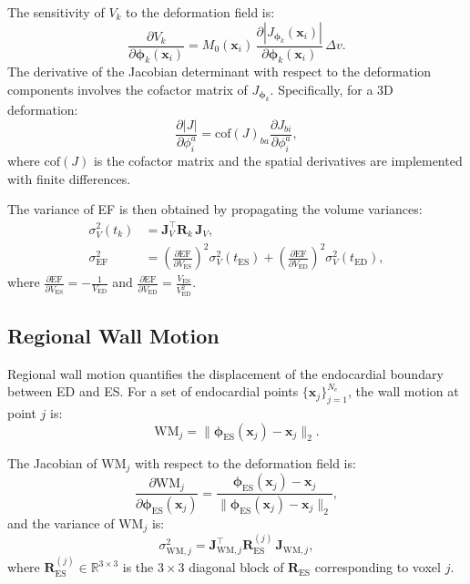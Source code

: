 \documentclass[10pt,twocolumn]{article}
\newcommand{\R}{\mathbb{R}}
\begin{document}
The sensitivity of $V_k$ to the deformation field is:
\begin{equation}
    \frac{\partial V_k}{\partial \bm{\phi}_k(\bm{x}_i)} = M_0(\bm{x}_i) \, \frac{\partial |J_{\bm{\phi}_k}(\bm{x}_i)|}{\partial \bm{\phi}_k(\bm{x}_i)} \, \Delta v.
    \label{eq:vol_sensitivity}
\end{equation}
The derivative of the Jacobian determinant with respect to the deformation components involves the cofactor matrix of $J_{\bm{\phi}_k}$. Specifically, for a 3D deformation:
\begin{equation}
    \frac{\partial |J|}{\partial \phi^a_i} = \text{cof}(J)_{ba} \frac{\partial J_{bi}}{\partial \phi^a_i},
    \label{eq:jac_det_deriv}
\end{equation}
where $\text{cof}(J)$ is the cofactor matrix and the spatial derivatives are implemented with finite differences.

The variance of EF is then obtained by propagating the volume variances:
\begin{align}
    \sigma^2_V(t_k) &= \bm{J}_V^\top \bm{R}_k \, \bm{J}_V, \label{eq:vol_var} \\
    \sigma^2_{\text{EF}} &= \left(\frac{\partial \text{EF}}{\partial V_{\text{ES}}}\right)^2 \sigma^2_V(t_{\text{ES}}) + \left(\frac{\partial \text{EF}}{\partial V_{\text{ED}}}\right)^2 \sigma^2_V(t_{\text{ED}}), \label{eq:ef_var}
\end{align}
where $\frac{\partial \text{EF}}{\partial V_{\text{ES}}} = -\frac{1}{V_{\text{ED}}}$ and $\frac{\partial \text{EF}}{\partial V_{\text{ED}}} = \frac{V_{\text{ES}}}{V_{\text{ED}}^2}$.

\subsection{Regional Wall Motion}

Regional wall motion quantifies the displacement of the endocardial boundary between ED and ES. For a set of endocardial points $\{\bm{x}_j\}_{j=1}^{N_e}$, the wall motion at point $j$ is:
\begin{equation}
    \text{WM}_j = \|\bm{\phi}_{\text{ES}}(\bm{x}_j) - \bm{x}_j\|_2.
    \label{eq:wm_def}
\end{equation}

The Jacobian of $\text{WM}_j$ with respect to the deformation field is:
\begin{equation}
    \frac{\partial \text{WM}_j}{\partial \bm{\phi}_{\text{ES}}(\bm{x}_j)} = \frac{\bm{\phi}_{\text{ES}}(\bm{x}_j) - \bm{x}_j}{\|\bm{\phi}_{\text{ES}}(\bm{x}_j) - \bm{x}_j\|_2},
    \label{eq:wm_jac}
\end{equation}
and the variance of $\text{WM}_j$ is:
\begin{equation}
    \sigma^2_{\text{WM},j} = \bm{J}_{\text{WM},j}^\top \bm{R}_{\text{ES}}^{(j)} \, \bm{J}_{\text{WM},j},
    \label{eq:wm_var}
\end{equation}
where $\bm{R}_{\text{ES}}^{(j)} \in \R^{3 \times 3}$ is the $3 \times 3$ diagonal block of $\bm{R}_{\text{ES}}$ corresponding to voxel $j$.
\end{document}
